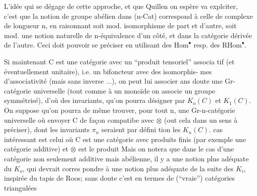 L'idée qui se dégage de cette approche, et que Quillen on espère va\linebreak
explciter, c'est que la  notion de groupe abélien\linebreak
dans (n-Cat) correspond à celle de complexe de  longueur n, en raisonnant\linebreak
soit mod. isomorphisme de part et d'autre, soit mod. une notion naturelle\linebreak
de n-équivalence d'un côté, et dans la catégorie dérivée de l'autre. Ceci\linebreak
doit pouvoir se préciser en utilisant des $\mathrm{Hom}^{\bullet}$ resp. des $\mathrm{RHom}^{\bullet}$.

Si maintenant C est une catégorie avec un ``produit tensoriel'' associa\linebreak
tif (et éventuellement unitaire), i.e. un bifoncteur avec des isomorphis-\linebreak
mes d'associativité (mais sans inverse ...), on peut lui associer ans\linebreak
doute une Gr-catégorie universelle (tout comme à un monoïde on associe un\linebreak
groupe symmétrisé), d'où des invariants, qu'on pourra désigner par $K_o(C)$\linebreak
et $K_1(C)$. On suppose qu'on pourra de même trouver, pour tout n, une\linebreak
Gr-n-catégorie universelle où envoyer C de façon compatibe avec $\otimes$ (out\linebreak
cela dans un sens à préciser), dont les invariants $\pi_n$ seraient par défini\linebreak
tion les $K_n(C)$.  cas intéressant est celui où C est une catégorie avec\linebreak
produits finis (par exemple une catégorie additive) et $\otimes$ est le produit\unsure{;|,}\linebreak
{} \deleted{(}\inserted{[}Mais on notera que dans le cas d'une catégorie non seulement additive\linebreak
mais abélienne, il y a une notion plus adéquate du $K_o$, qui devrait corres\linebreak
pondre à une notion plus adéquate de la suite des $K_i$, inspirée du tapis\linebreak
de Roos; sans doute c'est en termes de (``vraie'') catégories triangulées

